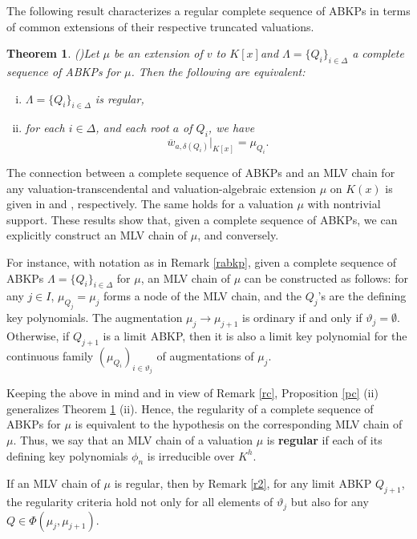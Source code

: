 \documentclass[11pt]{amsart}
\newtheorem{theorem}{Theorem}[section]
\theoremstyle{definition}
\theoremstyle{remark}
\numberwithin{equation}{section}
\begin{document}
		The following result characterizes a regular complete sequence of ABKPs in terms of common extensions of their respective truncated valuations.
		\begin{theorem}(\cite[Theorem 1.3]{AM})\label{am}
			Let $\mu$ be an extension of $v$ to $K[x]$and $\Lambda=\{Q_i\}_{i\in\Delta}$ a complete sequence of ABKPs  for $\mu$. Then the following are equivalent:
			\begin{enumerate}[(i)]
				\item $\Lambda=\{Q_i\}_{i\in\Delta}$ is regular,
				\item for each $i\in\Delta$, and each root $a$ of $Q_i$, we have \[\overline{w}_{a,\delta(Q_i)}|_{K[x]}=\mu_{Q_i}.\]
			\end{enumerate}
		\end{theorem}
		
		 
		 The connection between a complete sequence of ABKPs and an MLV chain for any valuation-transcendental and valuation-algebraic extension $\mu$ on $K(x)$ is given in \cite{SA1} and \cite{SA2}, respectively. The same holds for a valuation $\mu$ with nontrivial support. These results show that, given a complete sequence of ABKPs, we can explicitly construct an MLV chain of $\mu$, and conversely.
		 
		  For instance, with notation as in Remark \ref{rabkp}, given a complete sequence of ABKPs $\Lambda=\{Q_i\}_{i\in\Delta}$ for $\mu$, an MLV chain of $\mu$ can be constructed as follows: for any $j\in I$, $\mu_{Q_j}=\mu_j$ forms a node of the MLV chain, and the $Q_j$'s are the defining key polynomials. The augmentation $\mu_j\longrightarrow \mu_{j+1}$ is ordinary if and only if $\vartheta_j=\emptyset$. Otherwise, if $Q_{j+1}$ is a limit ABKP, then it is also a limit key polynomial for the continuous family $(\mu_{Q_i})_{i\in\vartheta_j}$ of augmentations of $\mu_j.$ 
		 
		 Keeping the above in mind and in view of Remark \ref{rc}, Proposition \ref{pc} (ii) generalizes Theorem \ref{am} (ii). Hence, the regularity of a complete sequence of ABKPs for $\mu$ is equivalent to the hypothesis on the corresponding MLV chain of $\mu.$  Thus, we say that an MLV chain of a valuation $\mu$ is {\bf regular} if each of its defining key polynomials $\phi_n$ is irreducible over $K^h.$
		 
		 If an MLV chain of $\mu$ is regular, then by Remark \ref{r2}, for any limit ABKP $Q_{j+1}$, the regularity criteria hold not only for all elements of $\vartheta_j$ but  also for any $Q\in\Phi(\mu_j,\mu_{j+1}).$
		
\end{document}
